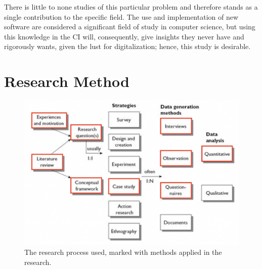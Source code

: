 There is little to none studies of this particular problem and therefore stands as a single contribution to the specific field. The use and implementation of new software are considered a significant field of study in computer science, but using this knowledge in the CI will, consequently, give insights they never have and rigorously wants, given the lust for digitalization; hence, this study is desirable.

\section*{Research Method}

\begin{figure}
    \includegraphics[scale=0.23]{empirisk_studie.png}
    \caption{The research process used, marked with methods applied in the research.}
    \label{fig:my_label}
\end{figure}

